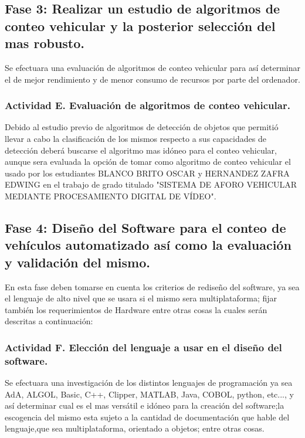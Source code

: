 \subsection{Fase 3: Realizar  un estudio de algoritmos de conteo vehicular y la posterior selección del mas robusto.}
Se efectuara una evaluación de algoritmos de conteo vehicular para así determinar el de mejor rendimiento y de menor consumo de recursos por parte del ordenador.

\subsubsection{Actividad E. Evaluación de algoritmos de conteo vehicular.}

Debido al estudio previo de algoritmos de detección de objetos que permitió llevar a cabo la clasificación de los mismos respecto a sus capacidades de detección deberá buscarse el algoritmo mas idóneo para el conteo vehicular, aunque  sera evaluada la opción de tomar como algoritmo de conteo vehicular el usado por los estudiantes BLANCO BRITO OSCAR y HERNANDEZ ZAFRA EDWING en el trabajo de grado titulado "SISTEMA DE AFORO VEHICULAR MEDIANTE PROCESAMIENTO DIGITAL DE VÍDEO".


\subsection{Fase 4: Diseño del Software para el conteo de vehículos automatizado así como la evaluación y validación del mismo.}

En esta fase deben tomarse en cuenta los criterios de rediseño del software, ya sea el lenguaje de alto nivel que se usara si el mismo sera multiplataforma; fijar también los requerimientos de Hardware entre otras cosas la cuales serán descritas a continuación:

\subsubsection{Actividad F. Elección del lenguaje a usar en el diseño del software. }

Se efectuara una investigación de los distintos lenguajes de programación ya sea AdA, ALGOL, Basic, C++, Clipper, MATLAB, Java, COBOL, python, etc..., y así determinar cual es el mas versátil e idóneo para la creación del software;la escogencia del mismo esta sujeto a la cantidad de documentación que hable del lenguaje,que sea multiplataforma, orientado a objetos; entre otras cosas.

